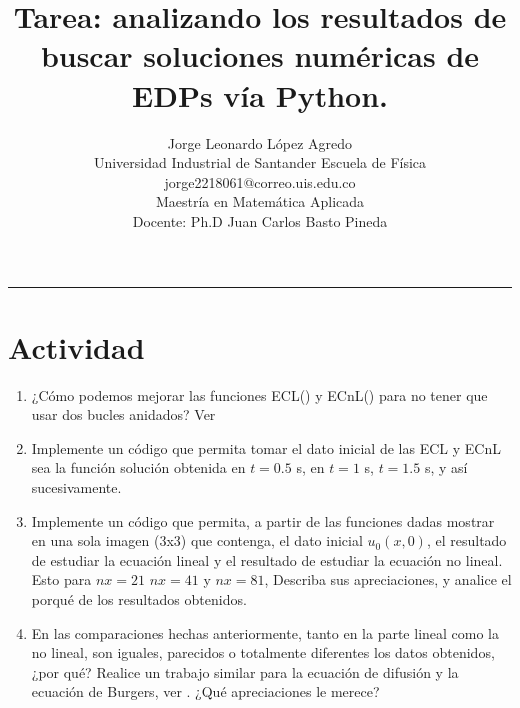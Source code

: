 \documentclass[A4,10pt]{article}
\title{{\huge \textbf{Tarea: analizando los resultados de buscar soluciones  numéricas de EDPs  vía Python.}}}
\author{Jorge Leonardo López Agredo\\ 
	\small Universidad Industrial de Santander Escuela de Física\\
	 \small jorge2218061@correo.uis.edu.co\\ 
	\small Maestría en Matemática Aplicada\\
	 Docente: Ph.D Juan Carlos Basto Pineda\\ 
	\date{}
 }
\begin{document}
	\maketitle
	\vspace*{-1.5cm}
\begin{center}\rule{0.9\textwidth}{0.1mm} \end{center}

\section{Actividad}


\begin{enumerate}
	\item ¿Cómo podemos mejorar las funciones ECL() y ECnL() para no tener que usar dos bucles anidados? Ver \cite{LeonardoEC}
	
	\item Implemente un código que permita tomar el dato inicial de las ECL y ECnL sea la función solución obtenida en $t= 0.5$ s, en $t=1$ s, $t=1.5$ s, y así sucesivamente.
	
	\item Implemente un código que permita, a partir de las funciones dadas mostrar en una sola imagen (3x3) que contenga,  el dato inicial $u_0(x,0)$, el resultado de estudiar la ecuación lineal y el resultado de estudiar la ecuación no lineal. Esto para $nx= 21$ $nx= 41$ y $nx= 81$,  Describa sus apreciaciones, y analice el porqué de los resultados obtenidos.
	
	\item En las comparaciones hechas anteriormente, tanto en la parte lineal como la no lineal, son iguales, parecidos o totalmente diferentes los datos obtenidos, ¿por qué? Realice un trabajo similar para la ecuación de difusión y la ecuación de Burgers, ver \cite{LeonardoED}. ¿Qué apreciaciones le merece?
	
\end{enumerate}
\end{document}
